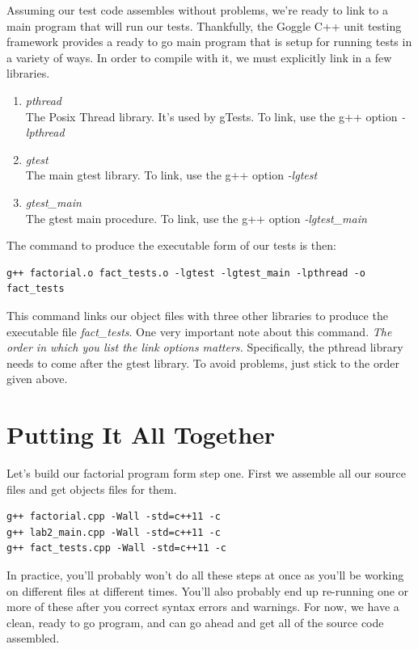 \documentclass[]{tufte-handout}
\begin{document}
Assuming our test code assembles without problems, we're ready to link to a main program that will run our tests.  Thankfully, the Goggle C++ unit testing framework provides a ready to go main program that is setup for running tests in a variety of ways. In order to compile with it, we must explicitly link in a few libraries. 
\begin{enumerate}
\item \textit{pthread} \\ The Posix Thread library. It's used by gTests. To link, use the g++ option \textit{-lpthread}
\item \textit{gtest} \\ The main gtest library. To link, use the g++ option \textit{-lgtest}
\item \textit{gtest\_main} \\ The gtest main procedure. To link, use the g++ option \textit{-lgtest\_main}
\end{enumerate}

The command to produce the executable form of our tests is then:
\begin{verbatim}
g++ factorial.o fact_tests.o -lgtest -lgtest_main -lpthread -o fact_tests
\end{verbatim}
This command links our object files with three other libraries to produce the executable file \textit{fact\_tests}.  One very important note about this command.  \textit{The order in which you list the link options matters.} Specifically, the pthread library needs to come after the gtest library.  To avoid problems, just stick to the order given above.   


\section{Putting It All Together}

Let's build our factorial program form step one. First we assemble all our source files and get objects files for them.  
\begin{verbatim}
g++ factorial.cpp -Wall -std=c++11 -c
g++ lab2_main.cpp -Wall -std=c++11 -c
g++ fact_tests.cpp -Wall -std=c++11 -c
\end{verbatim}
In practice, you'll probably won't do all these steps at once as you'll be working on different files at different times.  You'll also probably end up re-running one or more of these after you correct syntax errors and warnings. For now, we have a clean, ready to go program, and can go ahead and get all of the source code assembled. 
\end{document}
